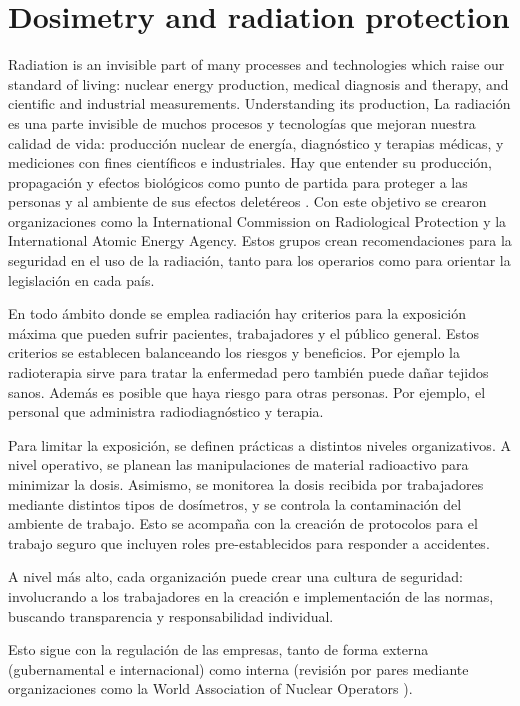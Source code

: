 \section{Dosimetry and radiation protection}
Radiation is an invisible part of many processes
and technologies which raise our standard of living:
nuclear energy production, medical diagnosis and therapy,
and cientific and industrial measurements.
Understanding its production, 
La radiación es una parte invisible de muchos procesos 
y tecnologías que mejoran nuestra calidad de vida:
producción nuclear de energía, 
diagnóstico y terapias médicas, 
y mediciones con fines científicos e industriales.
Hay que entender su producción, propagación y efectos biológicos
como punto de partida para 
proteger a las personas y al ambiente de sus efectos deletéreos
\cite{iaea_radiation_????}.
Con este objetivo se crearon organizaciones como la International Commission on
Radiological Protection\cite{_icrp_????} y la International Atomic Energy
Agency\cite{iaea_official_????}.
Estos grupos crean recomendaciones para la seguridad en el uso de la radiación,
tanto para los operarios como para orientar la legislación en cada país.

En todo ámbito donde se emplea radiación 
hay criterios para la exposición máxima 
que pueden sufrir pacientes,
trabajadores y el público general.
Estos criterios se establecen balanceando los riesgos y beneficios.
Por ejemplo la radioterapia sirve para tratar la enfermedad
pero también puede dañar tejidos sanos.
Además es posible que haya riesgo para otras personas.
Por ejemplo, el personal que administra radiodiagnóstico y terapia.

Para limitar la exposición,
se definen prácticas a distintos niveles organizativos.
A nivel operativo, se planean las manipulaciones de material radioactivo
para minimizar la dosis.
Asimismo, se monitorea la dosis recibida por trabajadores 
mediante distintos tipos de dosímetros,
y se controla la contaminación del ambiente de trabajo.
Esto se acompaña con la creación de protocolos para el trabajo seguro
que incluyen roles pre-establecidos para responder a accidentes.

A nivel más alto, cada organización puede crear una cultura de seguridad:
involucrando a los trabajadores en la creación e implementación de las normas,
buscando transparencia y responsabilidad individual. 

Esto sigue con 
la regulación de las empresas, tanto de forma externa 
(gubernamental e internacional) como interna (revisión por pares mediante
organizaciones como la World Association of Nuclear Operators
\cite{washington_practice_1997}).
